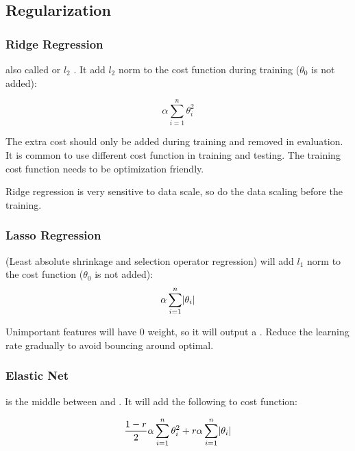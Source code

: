 \subsection{Regularization}

\subsubsection{Ridge Regression}

 also called  or $l_2$ . It add $l_2$ norm to the cost function during training ($\theta_0$ is not added):

\begin{equation}
	\alpha \sum_{i=1}^n \theta_i^2
\end{equation}


The extra cost should only be added during training and removed in evaluation. It is common to use different cost function in training and testing. The training cost function needs to be optimization friendly. 

Ridge regression is very sensitive to data scale, so do the data scaling before the training. 




\subsubsection{Lasso Regression}
 (Least absolute shrinkage and selection operator regression) will add $l_1$ norm to the cost function ($\theta_0$ is not added):
\begin{equation}
	\alpha \sum_{i=1}^n \abs{\theta_i}
\end{equation}

Unimportant features will have $0$ weight, so it will output a . Reduce the learning rate gradually to avoid bouncing around optimal.


\subsubsection{Elastic Net}
 is the middle between  and . It will add the following to cost function:

\begin{equation}
	\frac{1-r}{2} \alpha \sum_{i=1}^n \theta_i^2 + r \alpha \sum_{i=1}^n \abs{\theta_i}
\end{equation}

